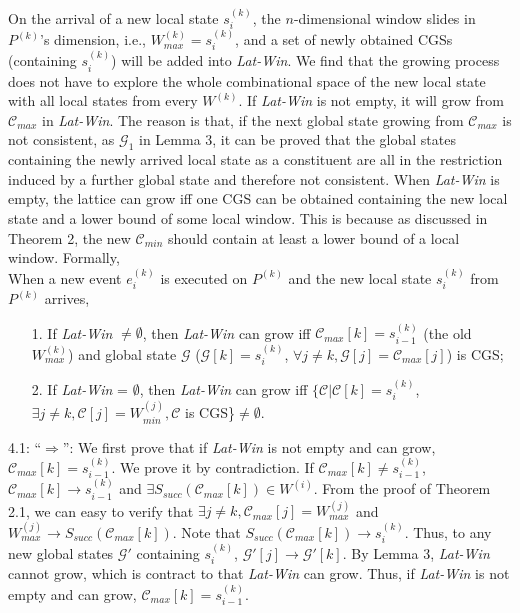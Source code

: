 \documentclass[12pt,journal,letterpaper,compsoc]{IEEEtran}
\begin{document}
On the arrival of a new local state $s^{(k)}_{i}$, the $n$-dimensional window slides in $P^{(k)}$'s dimension, i.e., $W^{(k)}_{max} = s^{(k)}_{i}$, and a set of newly obtained CGSs (containing $s^{(k)}_{i}$) will be added into {\it Lat-Win}. We find that the growing process does not have to explore the whole combinational space of the new local state with all local states from every $W^{(k)}$. If {\it Lat-Win} is not empty, it will grow from $\mathcal{C}_{max}$ in {\it Lat-Win}. The reason is that, if the next global state growing from $\mathcal{C}_{max}$ is not consistent, as $\mathcal{G}_1$ in Lemma 3, it can be proved that the global states containing the newly arrived local state as a constituent are all in the restriction induced by a further global state and therefore not consistent. When {\it Lat-Win} is empty, the lattice can grow iff one CGS can be obtained containing the new local state and a lower bound of some local window. This is because as discussed in Theorem 2, the new $\mathcal{C}_{min}$ should contain at least a lower bound of a local window. Formally, \\

 When a new event $e^{(k)}_{i}$ is executed on $P^{(k)}$ and the new local state $s^{(k)}_{i}$ from $P^{(k)}$ arrives,
\begin{itemize}
    \item[1.] If {\it Lat-Win} $\neq \emptyset$, then {\it Lat-Win} can grow iff $\mathcal{C}_{max}[k] = s^{(k)}_{i-1}$ (the old $W^{(k)}_{max}$) and global state $\mathcal{G}$ ($\mathcal{G}[k] = s^{(k)}_{i}$, $\forall j \neq k, \mathcal{G}[j] = \mathcal{C}_{max}[j]$) is CGS;
    \item[2.] If {\it Lat-Win} = $\emptyset$, then {\it Lat-Win} can grow iff $\{\mathcal{C}|\mathcal{C}[k] = s^{(k)}_i$, $\exists j\neq k, \mathcal{C}[j] = W^{(j)}_{min}, \mathcal{C}$ is CGS\}$\neq \emptyset$.
\end{itemize}


4.1: ``$\Rightarrow$'': We first prove that if {\it Lat-Win} is not empty and can grow, $\mathcal{C}_{max}[k] = s^{(k)}_{i-1}$. We prove it by contradiction. If $\mathcal{C}_{max}[k] \neq s^{(k)}_{i-1}$, $\mathcal{C}_{max}[k] \rightarrow s^{(k)}_{i-1}$ and $\exists S_{succ}(\mathcal{C}_{max}[k]) \in W^{(i)}$. From the proof of Theorem 2.1, we can easy to verify that $\exists j\neq k, \mathcal{C}_{max}[j] = W^{(j)}_{max}$ and $W^{(j)}_{max} \rightarrow S_{succ}(\mathcal{C}_{max}[k])$. Note that $S_{succ}(\mathcal{C}_{max}[k]) \rightarrow s^{(k)}_{i}$. Thus, to any new global states $\mathcal{G}'$ containing $s^{(k)}_{i}$, $\mathcal{G}'[j] \rightarrow \mathcal{G}'[k]$. By Lemma 3, {\it Lat-Win} cannot grow, which is contract to that {\it Lat-Win} can grow. Thus, if {\it Lat-Win} is not empty and can grow, $\mathcal{C}_{max}[k] = s^{(k)}_{i-1}$.
\end{document}
